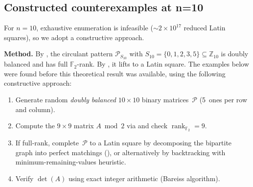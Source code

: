 \documentclass[11pt,a4paper]{article}
\newcommand{\ZZ}{\mathbb{Z}}
\newcommand{\FF}{\mathbb{F}}
\newcommand{\rank}{\operatorname{rank}}
\begin{document}
\subsection{Constructed counterexamples at n=10}\label{subsec:n10}

For $n=10$, exhaustive enumeration is infeasible ($\sim\!2\times 10^{17}$
reduced Latin squares), so we adopt a constructive approach.

\medskip\noindent
\textbf{Method.}
By , the circulant pattern
$\mathcal{P}_{S_{10}}$ with $S_{10}=\{0,1,2,3,5\}\subseteq\ZZ_{10}$
is doubly balanced and has full $\FF_2$-rank.
By , it lifts to a Latin square.
The examples below were found before this theoretical result was
available, using the following constructive approach:
\begin{enumerate}[leftmargin=2em]
  \item Generate random \emph{doubly balanced} $10\times 10$ binary
        matrices~$\mathcal{P}$ (5~ones per row and column).
  \item Compute the $9\times 9$ matrix $A\bmod 2$ via
         and check $\rank_{\FF_2}=9$.
  \item If full-rank, complete~$\mathcal{P}$ to a
        Latin square by decomposing the bipartite graph into perfect
        matchings (), or alternatively by
        backtracking with minimum-remaining-values heuristic.
  \item Verify $\det(A)$ using exact integer arithmetic (Bareiss
        algorithm).
\end{enumerate}
\end{document}
